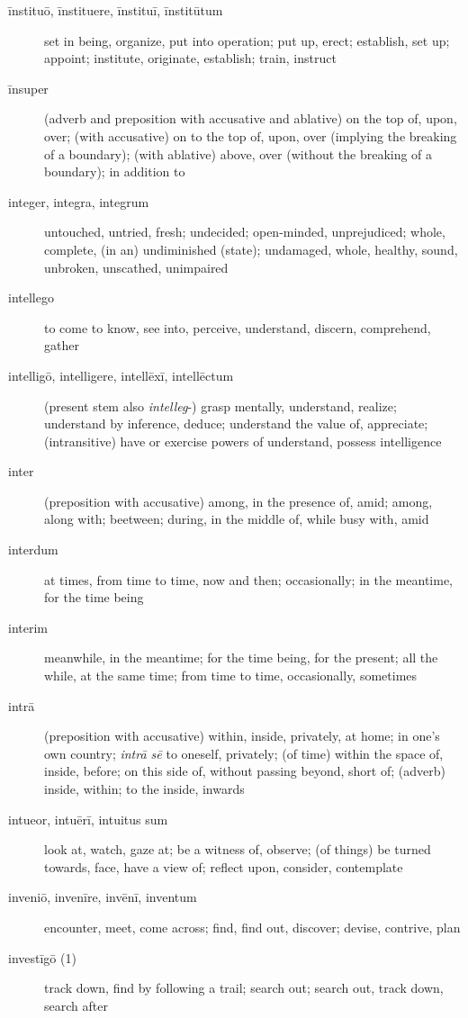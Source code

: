 \begin{description}
    \item[īnstituō, īnstituere, īnstituī, īnstitūtum] set in being, organize, put into operation; put up, erect; establish, set up; appoint; institute, originate, establish; train, instruct
    \item[īnsuper] (adverb and preposition with accusative and ablative) on the top of, upon, over; (with accusative) on to the top of, upon, over (implying the breaking of a boundary); (with ablative) above, over (without the breaking of a boundary); in addition to
    \item[integer, integra, integrum] untouched, untried, fresh; undecided; open-minded, unprejudiced; whole, complete, (in an) undiminished (state); undamaged, whole, healthy, sound, unbroken, unscathed, unimpaired
    \item[intellego] to come to know, see into, perceive, understand, discern, comprehend, gather
    \item[intelligō, intelligere, intellēxī, intellēctum] (present stem also \textit{intelleg}-) grasp mentally, understand, realize; understand by inference, deduce; understand the value of, appreciate; (intransitive) have or exercise powers of understand, possess intelligence
    \item[inter] (preposition with accusative) among, in the presence of, amid; among, along with; beetween; during, in the middle of, while busy with, amid
    \item[interdum] at times, from time to time, now and then; occasionally; in the meantime, for the time being
    \item[interim] meanwhile, in the meantime; for the time being, for the present; all the while, at the same time; from time to time, occasionally, sometimes
    \item[intrā] (preposition with accusative) within, inside, privately, at home; in one's own country; \textit{intrā sē} to oneself, privately; (of time) within the space of, inside, before; on this side of, without passing beyond, short of; (adverb) inside, within; to the inside, inwards
    \item[intueor, intuērī, intuitus sum] look at, watch, gaze at; be a witness of, observe; (of things) be turned towards, face, have a view of; reflect upon, consider, contemplate
    \item[inveniō, invenīre, invēnī, inventum] encounter, meet, come across; find, find out, discover; devise, contrive, plan
    \item[investīgō (1)] track down, find by following a trail; search out; search out, track down, search after

\end{description}
